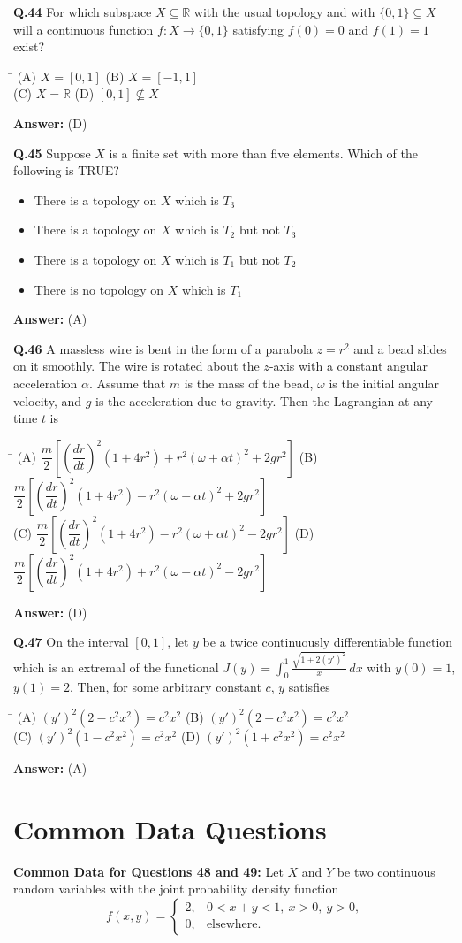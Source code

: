 \documentclass[11pt,a4paper]{article}
\newcommand{\optsfourA}[4]{%
  \begin{tabbing}
    \hspace{0.48\linewidth}\=\kill
    (A) #1 \> (B) #2 \\[2pt]
    (C) #3 \> (D) #4
  \end{tabbing}%
}
\newcommand{\optslistA}[4]{%
  \begin{itemize}
    \setlength{\itemsep}{2pt}\setlength{\parskip}{0pt}
    \item[(A)] #1
    \item[(B)] #2
    \item[(C)] #3
    \item[(D)] #4
  \end{itemize}%
}
\newcommand{\ans}[1]{\textbf{Answer:} #1\par\medskip}
\begin{document}
\textbf{Q.44} For which subspace $X \subseteq \mathbb{R}$ with the usual topology and with $\{0, 1\} \subseteq X$ will a continuous function $f : X \to \{0, 1\}$ satisfying $f(0) = 0$ and $f(1) = 1$ exist?
\optsfourA{$X = [0, 1]$}{$X = [-1, 1]$}{$X = \mathbb{R}$}{$[0, 1] \not\subseteq X$}
\ans{(D)}

\textbf{Q.45} Suppose $X$ is a finite set with more than five elements. Which of the following is TRUE?
\optslistA{There is a topology on $X$ which is $T_3$}{There is a topology on $X$ which is $T_2$ but not $T_3$}{There is a topology on $X$ which is $T_1$ but not $T_2$}{There is no topology on $X$ which is $T_1$}
\ans{(A)}

\textbf{Q.46} A massless wire is bent in the form of a parabola $z = r^2$ and a bead slides on it smoothly. The wire is rotated about the $z$-axis with a constant angular acceleration $\alpha$. Assume that $m$ is the mass of the bead, $\omega$ is the initial angular velocity, and $g$ is the acceleration due to gravity. Then the Lagrangian at any time $t$ is
\optsfourA{$\dfrac{m}{2}\!\left[\left(\dfrac{dr}{dt}\right)^2(1 + 4r^2) + r^2(\omega + \alpha t)^2 + 2gr^2\right]$}{$\dfrac{m}{2}\!\left[\left(\dfrac{dr}{dt}\right)^2(1 + 4r^2) - r^2(\omega + \alpha t)^2 + 2gr^2\right]$}{$\dfrac{m}{2}\!\left[\left(\dfrac{dr}{dt}\right)^2(1 + 4r^2) - r^2(\omega + \alpha t)^2 - 2gr^2\right]$}{$\dfrac{m}{2}\!\left[\left(\dfrac{dr}{dt}\right)^2(1 + 4r^2) + r^2(\omega + \alpha t)^2 - 2gr^2\right]$}
\ans{(D)}

\textbf{Q.47} On the interval $[0, 1]$, let $y$ be a twice continuously differentiable function which is an extremal of the functional $J(y) = \displaystyle\int_0^1 \frac{\sqrt{1 + 2(y')^2}}{x}\,dx$ with $y(0) = 1$, $y(1) = 2$. Then, for some arbitrary constant $c$, $y$ satisfies
\optsfourA{$(y')^2(2 - c^2 x^2) = c^2 x^2$}{$(y')^2(2 + c^2 x^2) = c^2 x^2$}{$(y')^2(1 - c^2 x^2) = c^2 x^2$}{$(y')^2(1 + c^2 x^2) = c^2 x^2$}
\ans{(A)}

\section*{Common Data Questions}

\textbf{Common Data for Questions 48 and 49:}
Let $X$ and $Y$ be two continuous random variables with the joint probability density function
\[
  f(x, y) = \begin{cases} 2, & 0 < x + y < 1,\ x > 0,\ y > 0, \\ 0, & \text{elsewhere.} \end{cases}
\]
\end{document}
